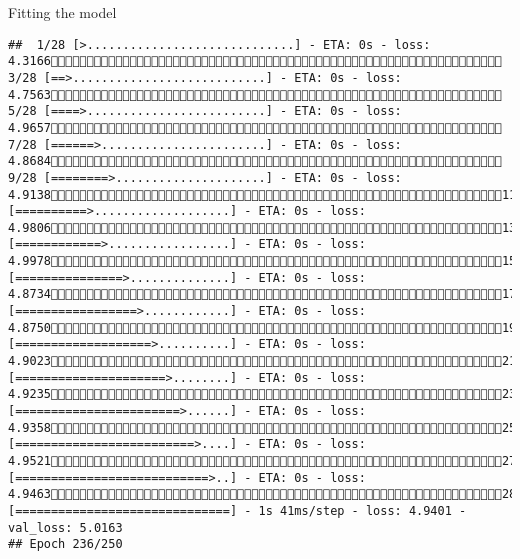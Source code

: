 \documentclass[
  ignorenonframetext,
]{beamer}
\begin{document}
\begin{frame}[fragile]{Fitting the model}
\begin{verbatim}
##  1/28 [>.............................] - ETA: 0s - loss: 4.3166 3/28 [==>...........................] - ETA: 0s - loss: 4.7563 5/28 [====>.........................] - ETA: 0s - loss: 4.9657 7/28 [======>.......................] - ETA: 0s - loss: 4.8684 9/28 [========>.....................] - ETA: 0s - loss: 4.913811/28 [==========>...................] - ETA: 0s - loss: 4.980613/28 [============>.................] - ETA: 0s - loss: 4.997815/28 [===============>..............] - ETA: 0s - loss: 4.873417/28 [=================>............] - ETA: 0s - loss: 4.875019/28 [===================>..........] - ETA: 0s - loss: 4.902321/28 [=====================>........] - ETA: 0s - loss: 4.923523/28 [=======================>......] - ETA: 0s - loss: 4.935825/28 [=========================>....] - ETA: 0s - loss: 4.952127/28 [===========================>..] - ETA: 0s - loss: 4.946328/28 [==============================] - 1s 41ms/step - loss: 4.9401 - val_loss: 5.0163
## Epoch 236/250

\end{verbatim}
\end{frame}
\end{document}
